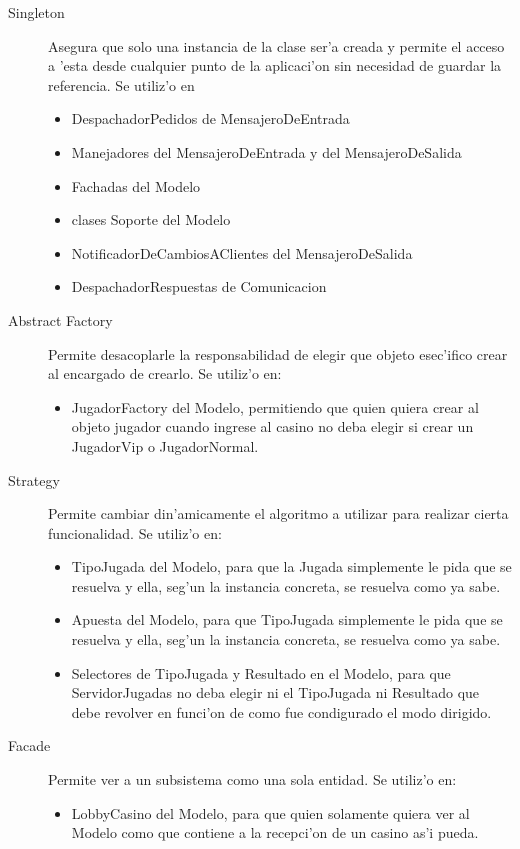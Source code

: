 \begin{description}
\item[Singleton] Asegura que solo una instancia de la clase ser'a creada y permite el acceso a 'esta desde cualquier punto de la aplicaci'on sin necesidad de guardar la referencia. Se utiliz'o en
	\begin{itemize}
	\item DespachadorPedidos de MensajeroDeEntrada
	\item Manejadores del MensajeroDeEntrada y del MensajeroDeSalida
	\item Fachadas del Modelo
	\item clases Soporte del Modelo
	\item NotificadorDeCambiosAClientes del MensajeroDeSalida
	\item DespachadorRespuestas de Comunicacion
	\end{itemize}
\item[Abstract Factory] Permite desacoplarle la responsabilidad de elegir que objeto esec'ifico crear al encargado de crearlo. Se utiliz'o en:
	\begin{itemize}
	\item JugadorFactory del Modelo, permitiendo que quien quiera crear al objeto jugador cuando ingrese al casino no deba elegir si crear un JugadorVip o JugadorNormal.
	\end{itemize}
\item[Strategy] Permite cambiar din'amicamente el algoritmo a utilizar para realizar cierta funcionalidad. Se utiliz'o en:
	\begin{itemize}
	\item TipoJugada del Modelo, para que la Jugada simplemente le pida que se resuelva y ella, seg'un la instancia concreta, se resuelva como ya sabe.
	\item Apuesta del Modelo, para que TipoJugada simplemente le pida que se resuelva y ella, seg'un la instancia concreta, se resuelva como ya sabe.
	\item Selectores de TipoJugada y Resultado en el Modelo, para que ServidorJugadas no deba elegir ni el TipoJugada ni Resultado que debe revolver en funci'on de como fue condigurado el modo dirigido.
	\end{itemize}
\item[Facade] Permite ver a un subsistema como una sola entidad. Se utiliz'o en:
	\begin{itemize}
	\item LobbyCasino del Modelo, para que quien solamente quiera ver al Modelo como que contiene a la recepci'on de un casino as'i pueda.

\end{itemize}
\end{description}
